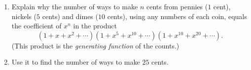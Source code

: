 \begin{enumerate}
\item[(a)] Explain why the number of ways to make $n$ cents from pennies ($1$ cent), nickels ($5$ cents) and dimes ($10$ cents), using any numbers of each coin, equals the coefficient of $x^n$ in the product
\[\left(1+x+x^2+\cdots\right)\left(1+x^5+x^{10}+\cdots\right)\left(1+x^{10}+x^{20}+\cdots\right).\]
(This product is the \emph{generating function} of the counts.)
\item[(b)] Use it to find the number of ways to make $25$ cents.
\end{enumerate}
